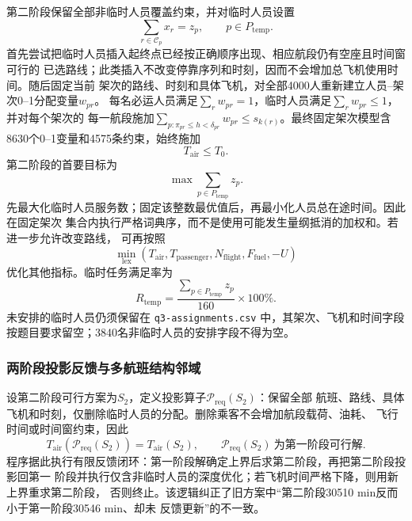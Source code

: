 \documentclass[UTF8,a4paper,zihao=5]{ctexart}
\begin{document}
第二阶段保留全部非临时人员覆盖约束，并对临时人员设置
\begin{equation}
  \sum_{r\in\mathcal{C}_p}x_r=z_p,
  \qquad p\in P_{\mathrm{temp}}.
  \label{eq:q3-temporary-cover}
\end{equation}
首先尝试把临时人员插入起终点已经按正确顺序出现、相应航段仍有空座且时间窗可行的
已选路线；此类插入不改变停靠序列和时刻，因而不会增加总飞机使用时间。随后固定当前
架次的路线、时刻和具体飞机，对全部4000人重新建立人员--架次0--1分配变量$w_{pr}$。
每名必运人员满足$\sum_r w_{pr}=1$，临时人员满足$\sum_r w_{pr}\le1$，并对每个架次的
每一航段施加$\sum_{p:\pi_{pr}\le h<\delta_{pr}}w_{pr}\le s_{k(r)}$。最终固定架次模型含
8630个0--1变量和4575条约束，始终施加
\begin{equation}
  T_{\mathrm{air}}\le T_0.
  \label{eq:q3-time-upper-bound}
\end{equation}
第二阶段的首要目标为
\begin{equation}
  \max \sum_{p\in P_{\mathrm{temp}}}z_p.
  \label{eq:q3-stage2-objective}
\end{equation}
先最大化临时人员服务数；固定该整数最优值后，再最小化人员总在途时间。因此在固定架次
集合内执行严格词典序，而不是使用可能发生量纲抵消的加权和。若进一步允许改变路线，
可再按照
\begin{equation}
  \min_{\mathrm{lex}}
  \left(
    T_{\mathrm{air}},
    T_{\mathrm{passenger}},
    N_{\mathrm{flight}},
    F_{\mathrm{fuel}},
    -U
  \right)
  \label{eq:q3-stage2-secondary}
\end{equation}
优化其他指标。临时任务满足率为
\begin{equation}
  R_{\mathrm{temp}}
  =\frac{\sum_{p\in P_{\mathrm{temp}}}z_p}{160}\times100\%.
  \label{eq:q3-temp-rate}
\end{equation}
未安排的临时人员仍须保留在 \texttt{q3-assignments.csv} 中，其架次、飞机和时间字段
按题目要求留空；3840名非临时人员的安排字段不得为空。

\subsubsection{两阶段投影反馈与多航班结构邻域}

设第二阶段可行方案为$S_2$，定义投影算子$\mathcal{P}_{\mathrm{req}}(S_2)$：保留全部
航班、路线、具体飞机和时刻，仅删除临时人员的分配。删除乘客不会增加航段载荷、油耗、
飞行时间或时间窗约束，因此
\begin{equation}
  T_{\mathrm{air}}\!\left(\mathcal{P}_{\mathrm{req}}(S_2)\right)
  =T_{\mathrm{air}}(S_2),
  \qquad
  \mathcal{P}_{\mathrm{req}}(S_2)\ \text{为第一阶段可行解}.
  \label{eq:q3-stage2-projection}
\end{equation}
程序据此执行有限反馈闭环：第一阶段解确定上界后求第二阶段，再把第二阶段投影回第一
阶段并执行仅含非临时人员的深度优化；若飞机时间严格下降，则用新上界重求第二阶段，
否则终止。该逻辑纠正了旧方案中“第二阶段30510 min反而小于第一阶段30546 min、却未
反馈更新”的不一致。
\end{document}

